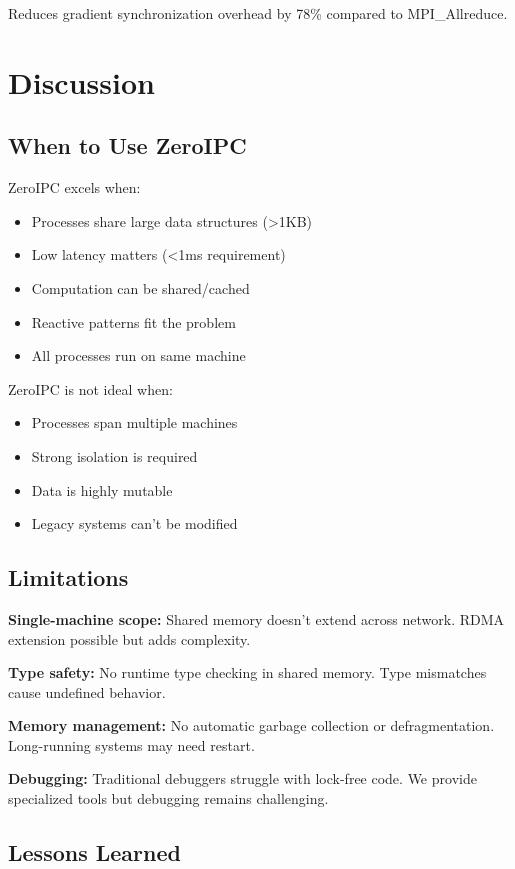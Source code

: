 \documentclass[letterpaper,twocolumn,10pt]{article}
\newcommand{\projectname}{ZeroIPC}
\begin{document}
Reduces gradient synchronization overhead by 78\% compared to MPI\_Allreduce.

\section{Discussion}

\subsection{When to Use \projectname{}}

\projectname{} excels when:
\begin{itemize}
\item Processes share large data structures (>1KB)
\item Low latency matters (<1ms requirement)
\item Computation can be shared/cached
\item Reactive patterns fit the problem
\item All processes run on same machine
\end{itemize}

\projectname{} is not ideal when:
\begin{itemize}
\item Processes span multiple machines
\item Strong isolation is required
\item Data is highly mutable
\item Legacy systems can't be modified
\end{itemize}

\subsection{Limitations}

\textbf{Single-machine scope:} Shared memory doesn't extend across network. RDMA extension possible but adds complexity.

\textbf{Type safety:} No runtime type checking in shared memory. Type mismatches cause undefined behavior.

\textbf{Memory management:} No automatic garbage collection or defragmentation. Long-running systems may need restart.

\textbf{Debugging:} Traditional debuggers struggle with lock-free code. We provide specialized tools but debugging remains challenging.

\subsection{Lessons Learned}
\end{document}
